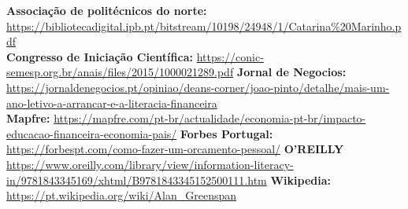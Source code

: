 \documentclass[a4paper,11pt]{report}
\begin{document}
	\begin{thebibliography}{99}

			\textbf{Associação de politécnicos do norte:}
				\url{https://bibliotecadigital.ipb.pt/bitstream/10198/24948/1/Catarina%20Marinho.pdf} \\
			\textbf{Congresso de Iniciação Científica:}
				\url{https://conic-semesp.org.br/anais/files/2015/1000021289.pdf}
			\textbf{Jornal de Negocios:}
				\url{https://jornaldenegocios.pt/opiniao/deans-corner/joao-pinto/detalhe/mais-um-ano-letivo-a-arrancar-e-a-literacia-financeira} \\
			\textbf{Mapfre:}
				\url{https://mapfre.com/pt-br/actualidade/economia-pt-br/impacto-educacao-financeira-economia-pais/}
			\textbf{Forbes Portugal:}
				\url{https://forbespt.com/como-fazer-um-orcamento-pessoal/}
			\textbf{O'REILLY}
				\url{https://www.oreilly.com/library/view/information-literacy-in/9781843345169/xhtml/B9781843345152500111.htm}
			\textbf{Wikipedia:} \url{https://pt.wikipedia.org/wiki/Alan_Greenspan}
	\end{thebibliography}
\end{document}
